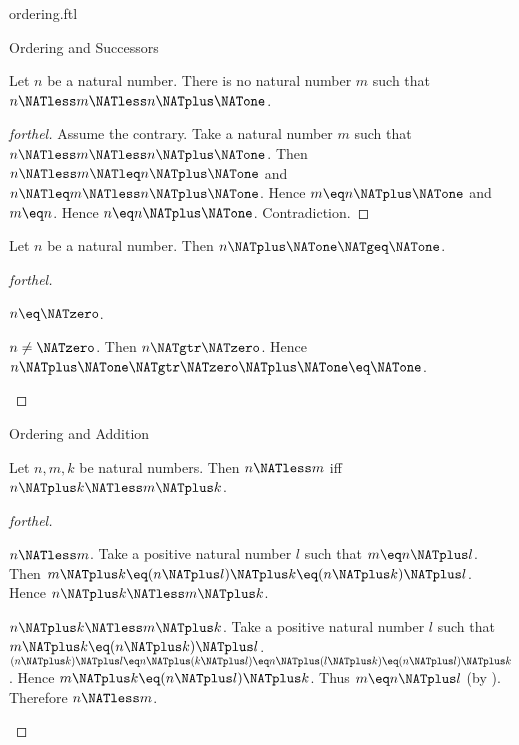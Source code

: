 \documentclass{naproche-library}
\begin{document}
\begin{smodule}[title=The Standard Ordering of the Natural Numbers]{ordering.ftl}
\begin{sfragment}{Ordering and Successors}
  \begin{corollary}[forthel,id=ARITHMETIC_04_1802826644717568]
    Let $n$ be a natural number.
    There is no natural number $m$ such that $n \NATless m \NATless n \NATplus \NATone$.
  \end{corollary}
  \begin{proof}[forthel]
    Assume the contrary.
    Take a natural number $m$ such that $n \NATless m \NATless n \NATplus \NATone$.
    Then $n \NATless m \NATleq n \NATplus \NATone$ and $n \NATleq m \NATless n \NATplus \NATone$.
    Hence $m \eq n \NATplus \NATone$ and $m \eq n$.
    Hence $n \eq n \NATplus \NATone$.
    Contradiction.
  \end{proof}

  \begin{proposition}[forthel,id=ARITHMETIC_04_990407185924096]
    Let $n$ be a natural number.
    Then $n \NATplus \NATone \NATgeq \NATone$.
  \end{proposition}
  \begin{proof}[forthel]
    \begin{case}{$n \eq \NATzero$.} \end{case}

    \begin{case}{$n \neq \NATzero$.}
      Then $n \NATgtr \NATzero$.
      Hence $n \NATplus \NATone \NATgtr \NATzero \NATplus \NATone \eq \NATone$.
    \end{case}
  \end{proof}
\end{sfragment}

\begin{sfragment}{Ordering and Addition}
  \begin{proposition}[forthel,id=ARITHMETIC_04_7354062662008832]
    Let $n, m, k$ be natural numbers.
    Then $n \NATless m$ iff $n \NATplus k \NATless m \NATplus k$.
  \end{proposition}
  \begin{proof}[forthel]
    \begin{case}{$n \NATless m$.}
      Take a positive natural number $l$ such that $m \eq n \NATplus l$.
      Then $m \NATplus k
        \eq (n \NATplus l) \NATplus k
        \eq (n \NATplus k) \NATplus l$.
      Hence $n \NATplus k \NATless m \NATplus k$.
    \end{case}

    \begin{case}{$n \NATplus k \NATless m \NATplus k$.}
      Take a positive natural number $l$ such that $m \NATplus k \eq (n \NATplus k) \NATplus l$.
      $(n \NATplus k) \NATplus l
        \eq n \NATplus (k \NATplus l)
        \eq n \NATplus (l \NATplus k)
        \eq (n \NATplus l) \NATplus k$.
      Hence $m \NATplus k \eq (n \NATplus l) \NATplus k$.
      Thus $m \eq n \NATplus l$ (by ).
      Therefore $n \NATless m$.
    \end{case}
  \end{proof}


\end{sfragment}
\end{smodule}
\end{document}
